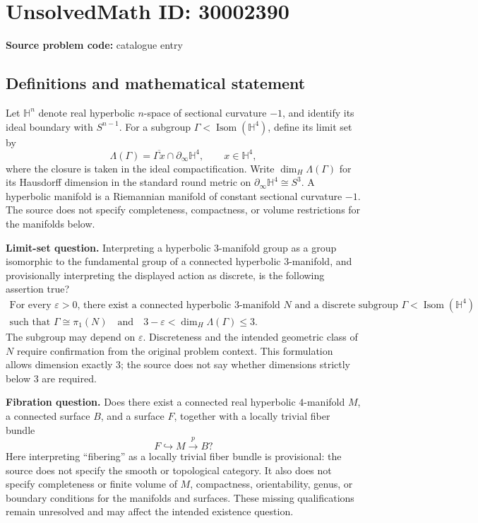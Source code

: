 \documentclass[11pt]{article}
\begin{document}
\section*{UnsolvedMath ID: 30002390}
\textbf{Source problem code:} catalogue entry
\subsection{Definitions and mathematical statement}
Let \(\mathbb H^n\) denote real hyperbolic \(n\)-space of sectional curvature \(-1\), and identify its ideal boundary with \(S^{n-1}\). For a subgroup \(\Gamma<\operatorname{Isom}(\mathbb H^4)\), define its limit set by
\[
\Lambda(\Gamma)=\overline{\Gamma x}\cap\partial_\infty\mathbb H^4,
\qquad x\in\mathbb H^4,
\]
where the closure is taken in the ideal compactification. Write \(\dim_H\Lambda(\Gamma)\) for its Hausdorff dimension in the standard round metric on \(\partial_\infty\mathbb H^4\cong S^3\). A hyperbolic manifold is a Riemannian manifold of constant sectional curvature \(-1\). The source does not specify completeness, compactness, or volume restrictions for the manifolds below.

\textbf{Limit-set question.} Interpreting a hyperbolic \(3\)-manifold group as a group isomorphic to the fundamental group of a connected hyperbolic \(3\)-manifold, and provisionally interpreting the displayed action as discrete, is the following assertion true?
\[
\begin{gathered}
\text{For every }\varepsilon>0\text{, there exist a connected hyperbolic }3\text{-manifold }N
\text{ and a discrete subgroup }\Gamma<\operatorname{Isom}(\mathbb H^4)\\
\text{such that }\Gamma\cong\pi_1(N)
\quad\text{and}\quad
3-\varepsilon<\dim_H\Lambda(\Gamma)\leq 3.
\end{gathered}
\]
The subgroup may depend on \(\varepsilon\). Discreteness and the intended geometric class of \(N\) require confirmation from the original problem context. This formulation allows dimension exactly \(3\); the source does not say whether dimensions strictly below \(3\) are required.

\textbf{Fibration question.} Does there exist a connected real hyperbolic \(4\)-manifold \(M\), a connected surface \(B\), and a surface \(F\), together with a locally trivial fiber bundle
\[
F\hookrightarrow M\xrightarrow{\ p\ }B?
\]
Here interpreting ``fibering'' as a locally trivial fiber bundle is provisional: the source does not specify the smooth or topological category. It also does not specify completeness or finite volume of \(M\), compactness, orientability, genus, or boundary conditions for the manifolds and surfaces. These missing qualifications remain unresolved and may affect the intended existence question.
\end{document}
